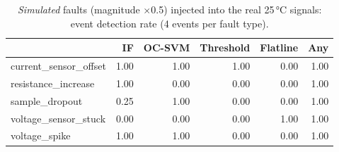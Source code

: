 \begin{table}[htbp]\centering\footnotesize
\begin{tabular}{lrrrrr}
\toprule
 & IF & OC-SVM & Threshold & Flatline & Any \\
\midrule
current\_sensor\_offset & 1.00 & 1.00 & 1.00 & 0.00 & 1.00 \\
resistance\_increase & 1.00 & 0.00 & 0.00 & 0.00 & 1.00 \\
sample\_dropout & 0.25 & 1.00 & 0.00 & 0.00 & 1.00 \\
voltage\_sensor\_stuck & 0.00 & 0.00 & 0.00 & 1.00 & 1.00 \\
voltage\_spike & 1.00 & 1.00 & 0.00 & 0.00 & 1.00 \\
\bottomrule
\end{tabular}
\caption{\emph{Simulated} faults (magnitude $\times$0.5) injected into the real 25\,°C signals: event detection rate (4 events per fault type).}\label{tab:faultsim05}
\end{table}
